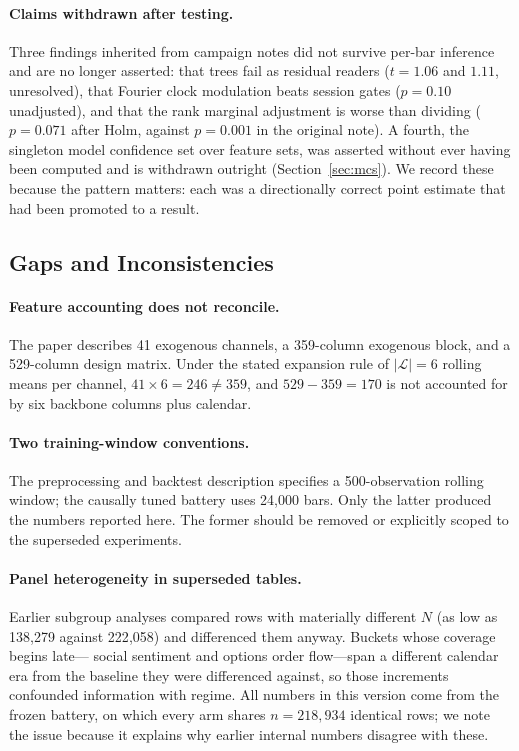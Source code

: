 \paragraph{Claims withdrawn after testing.} Three findings inherited from
campaign notes did not survive per-bar inference and are no longer asserted:
that trees fail as residual readers ($t = 1.06$ and $1.11$, unresolved), that
Fourier clock modulation beats session gates ($p = 0.10$ unadjusted), and that
the rank marginal adjustment is worse than dividing ($p = 0.071$ after Holm,
against $p = 0.001$ in the original note). A fourth, the singleton model
confidence set over feature sets, was asserted without ever having been
computed and is withdrawn outright (Section~\ref{sec:mcs}). We record these
because the pattern matters: each was a directionally correct point estimate
that had been promoted to a result.

\subsection{Gaps and Inconsistencies}

\paragraph{Feature accounting does not reconcile.} The paper describes 41
exogenous channels, a 359-column exogenous block, and a 529-column design
matrix. Under the stated expansion rule of $|\mathcal{L}| = 6$ rolling means
per channel, $41 \times 6 = 246 \ne 359$, and $529 - 359 = 170$ is not
accounted for by six backbone columns plus calendar.

\paragraph{Two training-window conventions.} The preprocessing and backtest
description specifies a 500-observation rolling window; the causally tuned
battery uses 24{,}000 bars. Only the latter produced the numbers reported here.
The former should be removed or explicitly scoped to the superseded
experiments.

\paragraph{Panel heterogeneity in superseded tables.} Earlier subgroup analyses
compared rows with materially different $N$ (as low as 138{,}279 against
222{,}058) and differenced them anyway. Buckets whose coverage begins late---
social sentiment and options order flow---span a different calendar era from
the baseline they were differenced against, so those increments confounded
information with regime. All numbers in this version come from the frozen
battery, on which every arm shares $n = 218{,}934$ identical rows; we note the
issue because it explains why earlier internal numbers disagree with these.


